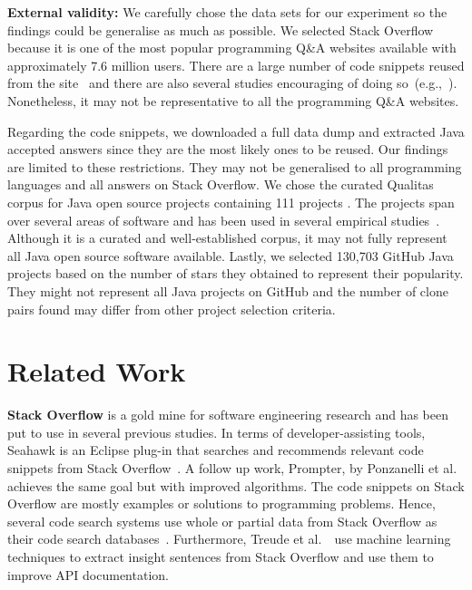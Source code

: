 \documentclass[10pt,journal,compsoc]{IEEEtran}
\begin{document}

\textbf{External validity:} We carefully chose the data sets for our
experiment so the findings could be generalise as much as possible.
We selected Stack Overflow because it is one of the most popular
programming Q\&A websites available with approximately 7.6 million
users. There are a large number of code snippets reused from the
site~\cite{An2017} and there are also several studies encouraging of
doing
so~(e.g.,~\cite{Ponzanelli2013,Ponzanelli2014,Keivanloo2014,Park2014}).
Nonetheless, it may not be representative to all the programming Q\&A
websites.

Regarding the code snippets, we downloaded a full data dump and extracted Java
accepted answers since they are the most likely ones to be reused. Our findings
are limited to these restrictions. They may not be generalised to all
programming languages and all answers on Stack Overflow. We chose the curated
Qualitas corpus for Java open source projects containing 111 projects
\cite{QualitasCorpus}.  The projects span over several areas of software and has
been used in several empirical
studies~\cite{Taube-Schock2011,Beckman2011,Vasilescu2011,Omar2012}. Although it
is a curated and well-established corpus, it may not fully represent all Java
open source software available. Lastly, we selected 130,703 GitHub Java projects
based on the number of stars they obtained to represent their popularity. They
might not represent all Java projects on GitHub and the number of clone pairs
found may differ from other project selection criteria.

\section{Related Work}

\textbf{Stack Overflow} is a gold mine for software engineering
research and
has been put to
use in several previous studies. In terms of developer-assisting
tools, Seahawk is an Eclipse plug-in that searches and recommends
relevant code snippets from Stack Overflow~\cite{Ponzanelli2013}. A
follow up work, Prompter, by Ponzanelli et al.~\cite{Ponzanelli2014}
achieves the same goal but with improved algorithms. The code snippets
on Stack Overflow are mostly examples or solutions to programming
problems. Hence, several code search systems use whole or partial data
from Stack Overflow as their code search
databases~\cite{Keivanloo2014,Park2014,
	Stolee2014,Subramanian2013,Diamantopoulos2015}. Furthermore, Treude
et al.~\cite{Treude2016}~use machine learning techniques to extract
insight sentences from Stack Overflow and use them to improve API
documentation.
\end{document}
